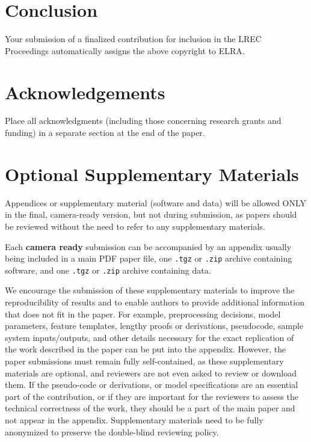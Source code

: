 \documentclass[10pt, a4paper]{article}
\begin{document}
\section{Conclusion}

Your submission of a finalized contribution for inclusion in the LREC Proceedings automatically assigns the above copyright to ELRA.

\section{Acknowledgements}

Place all acknowledgments (including those concerning research grants and funding) in a separate section at the end of the paper.

\section{Optional Supplementary Materials}

Appendices or supplementary material (software and data) will be allowed ONLY in the final, camera-ready version, but not during submission, as papers should be reviewed without the need to refer to any supplementary
materials.

Each \textbf{camera ready} submission can be accompanied by an appendix usually being included in a main PDF paper file, one \texttt{.tgz} or \texttt{.zip} archive containing software, and one \texttt{.tgz} or \texttt{.zip} archive containing data.

We encourage the submission of these supplementary materials to improve the reproducibility of results and to enable authors to provide additional information that does not fit in the paper. For example, preprocessing decisions, model parameters, feature templates, lengthy proofs or derivations, pseudocode, sample system inputs/outputs, and other details necessary for the exact replication of the work described in the paper can be put into the appendix. However, the paper submissions must remain fully self-contained, as these supplementary materials are optional, and reviewers are not even asked to review or download them. If the pseudo-code or derivations, or model specifications are an essential part of the contribution, or if they are important for the reviewers to assess the technical correctness of the work, they should be a part of the main paper and not appear in the appendix. Supplementary materials need to be fully anonymized to preserve the double-blind reviewing policy.
\end{document}
